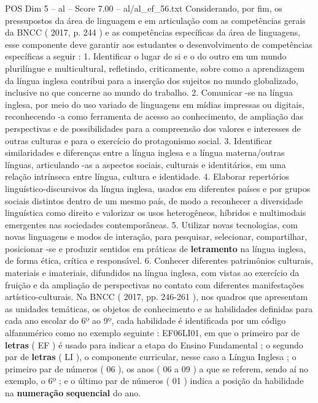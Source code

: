 \begin{textsample}{POS Dim 5 – al – Score 7.00 – al/al\_ef\_56.txt}
Considerando, por fim, os pressupostos da área de linguagem e em articulação com as competências gerais da BNCC ( 2017, p. 244 ) e as competências específicas da área de linguagens, esse componente deve garantir aos estudantes o desenvolvimento de competências específicas a seguir : 1.
Identificar o lugar de si e o do outro em um mundo plurilíngue e multicultural, refletindo, criticamente, sobre como a aprendizagem da língua inglesa contribui para a inserção dos sujeitos no mundo globalizado, inclusive no que concerne ao mundo do trabalho. 2.
Comunicar -se na língua inglesa, por meio do uso variado de linguagens em mídias impressas ou digitais, reconhecendo -a como ferramenta de acesso ao conhecimento, de ampliação das perspectivas e de possibilidades para a compreensão dos valores e interesses de outras culturas e para o exercício do protagonismo social. 3.
Identificar similaridades e diferenças entre a língua inglesa e a língua materna/outras línguas, articulando -as a aspectos sociais, culturais e identitários, em uma relação intrínseca entre língua, cultura e identidade. 4.
Elaborar repertórios linguístico-discursivos da língua inglesa, usados em diferentes países e por grupos sociais distintos dentro de um mesmo país, de modo a reconhecer a diversidade linguística como direito e valorizar os usos heterogêneos, híbridos e multimodais emergentes nas sociedades contemporâneas. 5.
Utilizar novas tecnologias, com novas linguagens e modos de interação, para pesquisar, selecionar, compartilhar, posicionar -se e produzir sentidos em práticas de \textbf{letramento} na língua inglesa, de forma ética, crítica e responsável. 6.
Conhecer diferentes patrimônios culturais, materiais e imateriais, difundidos na língua inglesa, com vistas ao exercício da fruição e da ampliação de perspectivas no contato com diferentes manifestações artístico-culturais.
Na BNCC ( 2017, pp. 246-261 ), nos quadros que apresentam as unidades temáticas, os objetos de conhecimento e as habilidades definidas para cada ano escolar do 6º ao 9º, cada habilidade é identificada por um código alfanumérico como no exemplo seguinte : EF06LI01, em que o primeiro par de \textbf{letras} ( EF ) é usado para indicar a etapa do Ensino Fundamental ; o segundo par de \textbf{letras} ( LI ), o componente curricular, nesse caso a Língua Inglesa ; o primeiro par de números ( 06 ), os anos ( 06 a 09 ) a que se referem, sendo aí no exemplo, o 6º ; e o último par de números ( 01 ) indica a posição da habilidade na \textbf{numeração} \textbf{sequencial} do ano.

\end{textsample}
